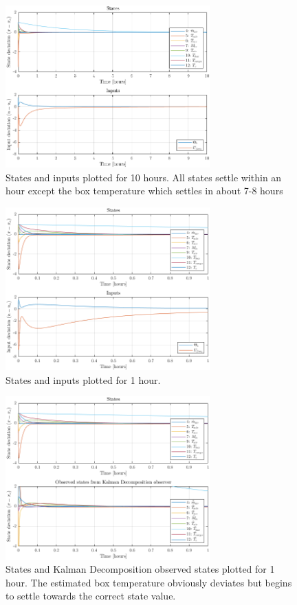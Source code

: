 \begin{figure}[h!]
	\centering
	\includegraphics[width=0.7\textwidth]{Graphics/fig_stateInput10h.png}
	\caption{States and inputs plotted for 10 hours. All states settle within an hour except the box temperature which settles in about 7-8 hours}
	\label{fig:sim_stateInput10h}
\end{figure}

\begin{figure}[h!]
	\centering
	\includegraphics[width=0.7\textwidth]{Graphics/fig_stateInput1h.png}
	\caption{States and inputs plotted for 1 hour.}
	\label{fig:sim_stateInput1h}
\end{figure}

\begin{figure}[h!]
	\centering
	\includegraphics[width=0.7\textwidth]{Graphics/fig_stateObsState1h.png}
	\caption{States and Kalman Decomposition observed states plotted for 1 hour. The estimated box temperature obviously deviates but begins to settle towards the correct state value.}
	\label{fig:sim_stateObsState1h}
\end{figure}

